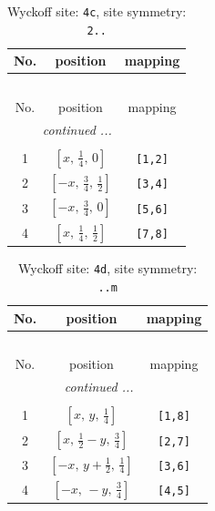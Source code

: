 \documentclass[fleqn,8pt]{jsarticle}
\begin{document}
\renewcommand{\arraystretch}{1.2}
\begin{longtable}{ccc}
\caption{Wyckoff site: {\tt 4c}, site symmetry: {\tt 2..}}
 \\
 \hline \hline
No. & position & mapping \\ \hline \endfirsthead

\multicolumn{2}{l}{\tablename\ \thetable{}} \\
 \hline \hline
No. & position & mapping \\ \hline \endhead

 \hline \hline
\multicolumn{2}{r}{\footnotesize\it continued ...} \\ \endfoot

 \hline \hline
\multicolumn{2}{r}{} \\ \endlastfoot

1 & $\left[ x,\, \frac{1}{4},\, 0 \right]$ & {\tt [1,2]} \\ \hline
2 & $\left[ - x,\, \frac{3}{4},\, \frac{1}{2} \right]$ & {\tt [3,4]} \\ \hline
3 & $\left[ - x,\, \frac{3}{4},\, 0 \right]$ & {\tt [5,6]} \\ \hline
4 & $\left[ x,\, \frac{1}{4},\, \frac{1}{2} \right]$ & {\tt [7,8]} \\
\end{longtable}
\renewcommand{\arraystretch}{1.2}
\begin{longtable}{ccc}
\caption{Wyckoff site: {\tt 4d}, site symmetry: {\tt ..m}}
 \\
 \hline \hline
No. & position & mapping \\ \hline \endfirsthead

\multicolumn{2}{l}{\tablename\ \thetable{}} \\
 \hline \hline
No. & position & mapping \\ \hline \endhead

 \hline \hline
\multicolumn{2}{r}{\footnotesize\it continued ...} \\ \endfoot

 \hline \hline
\multicolumn{2}{r}{} \\ \endlastfoot

1 & $\left[ x,\, y,\, \frac{1}{4} \right]$ & {\tt [1,8]} \\ \hline
2 & $\left[ x,\, \frac{1}{2} - y,\, \frac{3}{4} \right]$ & {\tt [2,7]} \\ \hline
3 & $\left[ - x,\, y + \frac{1}{2},\, \frac{1}{4} \right]$ & {\tt [3,6]} \\ \hline
4 & $\left[ - x,\, - y,\, \frac{3}{4} \right]$ & {\tt [4,5]} \\
\end{longtable}
\end{document}
